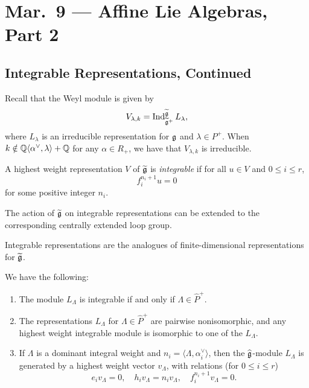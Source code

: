 \chapter{Mar.~9 --- Affine Lie Algebras, Part 2}

\section{Integrable Representations, Continued}

\begin{remark}
  Recall that the Weyl module is
  given by
  \[
    V_{\lambda, k}
    = \operatorname{Ind}_{\widetilde{\mathfrak{g}}^+}^{\widetilde{\mathfrak{g}}} L_\lambda,
  \]
  where $L_\lambda$ is an irreducible
  representation for $\mathfrak{g}$ and
  $\lambda \in P^+$. When
  $k \notin \mathbb{Q} \langle \alpha^\vee, \lambda \rangle + \mathbb{Q}$ for any $\alpha \in R_+$,
  we have that $V_{\lambda, k}$ is
  irreducible.
\end{remark}

\begin{definition}
  A highest weight representation
  $V$ of $\widetilde{\mathfrak{g}}$ is \emph{integrable}
  if for all $u \in V$ and $0 \le i \le r$,
  \[
    f_i^{n_i + 1} u = 0
  \]
  for some positive integer $n_i$.
\end{definition}

\begin{remark}
  The action of $\widetilde{\mathfrak{g}}$ on
  integrable representations can be extended
  to the corresponding centrally extended
  loop group.
\end{remark}

\begin{remark}
  Integrable representations are the analogues
  of finite-dimensional representations
  for $\widetilde{\mathfrak{g}}$.
\end{remark}

\begin{theorem}
  We have the following:
  \begin{enumerate}
    \item The module $L_\Lambda$ is
      integrable if and only if
      $\Lambda \in \widehat{P}^+$.
    \item The representations $L_\Lambda$ for
      $\Lambda \in \widehat{P}^+$ are pairwise
      nonisomorphic, and any highest weight
      integrable module is isomorphic to
      one of the $L_\Lambda$.
    \item If $\Lambda$ is a dominant integral
      weight and $n_i = \langle \Lambda, \alpha_i^\vee \rangle$,
      then the $\widehat{\mathfrak{g}}$-module $L_\Lambda$
      is generated by a highest weight
      vector $v_\Lambda$, with relations
      (for $0 \le i \le r$)
      \[
        e_i v_\Lambda = 0, \quad
        h_i v_\Lambda = n_i v_\Lambda, \quad
        f_i^{n_i + 1} v_\Lambda = 0.
      \]
  \end{enumerate}
\end{theorem}

